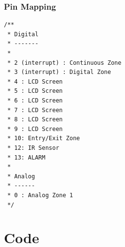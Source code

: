 \documentclass[a4paper,11pt]{article}
\theoremstyle{mytheor}
\begin{document}
\subsubsection{Pin Mapping}
\begin{lstlisting}
/**
 * Digital
 * -------
 * 
 * 2 (interrupt) : Continuous Zone 
 * 3 (interrupt) : Digital Zone
 * 4 : LCD Screen 
 * 5 : LCD Screen
 * 6 : LCD Screen
 * 7 : LCD Screen
 * 8 : LCD Screen
 * 9 : LCD Screen
 * 10: Entry/Exit Zone
 * 12: IR Sensor
 * 13: ALARM
 * 
 * Analog
 * ------
 * 0 : Analog Zone 1
 */
\end{lstlisting}

\section{Code}
\end{document}
